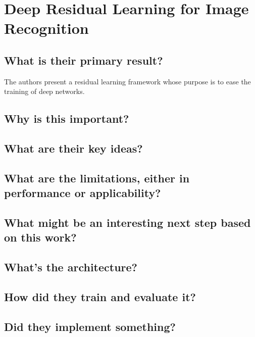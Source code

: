 \section{Deep Residual Learning for Image Recognition}
\subsection*{What is their primary result?}
The authors present a residual learning framework whose purpose is to ease the
training of deep networks. 

\subsection*{Why is this important?}

\subsection*{What are their key ideas?}

\subsection*{What are the limitations, either in performance or applicability?}

\subsection*{What might be an interesting next step based on this work?}

\subsection*{What's the architecture?}

\subsection*{How did they train and evaluate it?}

\subsection*{Did they implement something?}




